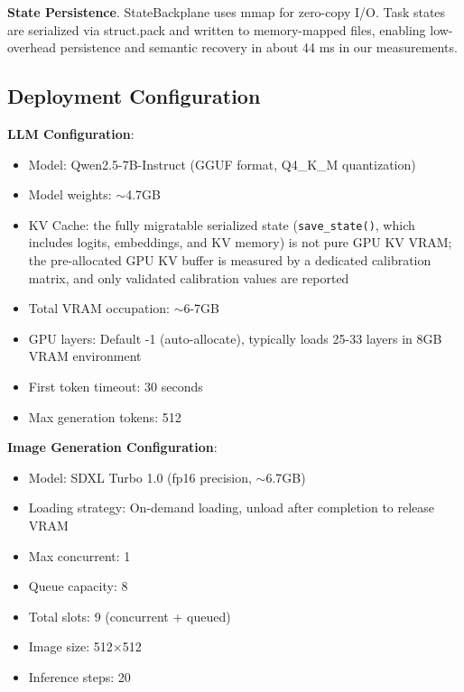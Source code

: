 \textbf{State Persistence}. StateBackplane uses mmap for zero-copy I/O. Task states are serialized via struct.pack and written to memory-mapped files, enabling low-overhead persistence and semantic recovery in about 44 ms in our measurements.

\subsection{Deployment Configuration}

\textbf{LLM Configuration}:
\begin{itemize}
\item Model: Qwen2.5-7B-Instruct (GGUF format, Q4\_K\_M quantization)
\item Model weights: $\sim$4.7GB
\item KV Cache: the fully migratable serialized state (\texttt{save\_state()}, which includes logits, embeddings, and KV memory) is not pure GPU KV VRAM; the pre-allocated GPU KV buffer is measured by a dedicated calibration matrix, and only validated calibration values are reported
\item Total VRAM occupation: $\sim$6-7GB
\item GPU layers: Default -1 (auto-allocate), typically loads 25-33 layers in 8GB VRAM environment
\item First token timeout: 30 seconds
\item Max generation tokens: 512
\end{itemize}

\textbf{Image Generation Configuration}:
\begin{itemize}
\item Model: SDXL Turbo 1.0 (fp16 precision, $\sim$6.7GB)
\item Loading strategy: On-demand loading, unload after completion to release VRAM
\item Max concurrent: 1
\item Queue capacity: 8
\item Total slots: 9 (concurrent + queued)
\item Image size: 512$\times$512
\item Inference steps: 20
\end{itemize}
